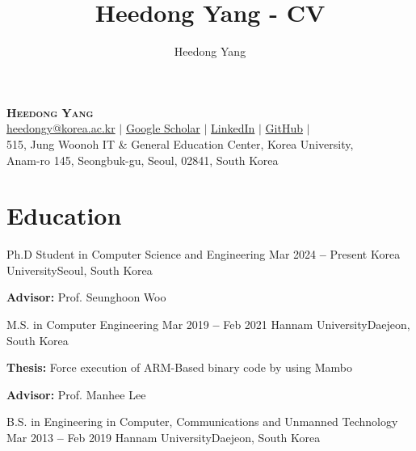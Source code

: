 \documentclass[letterpaper,11pt]{article}
\begin{document}
\title{Heedong Yang - CV}
\author{Heedong Yang}


\begin{center}
    \textbf{\Huge \scshape Heedong Yang} \\ \vspace{7pt}
    \small
    \faEnvelope \hspace{.5pt} \href{mailto:heedongy@korea.ac.kr}{heedongy@korea.ac.kr}
    $|$
    \faGraduationCap \hspace{.5pt} \href{https://scholar.google.co.kr/citations?user=Gqegeu0AAAAJ}{Google Scholar}
    $|$
\faLinkedin \hspace{.5pt} \href{https://www.linkedin.com/in/heedongy}{LinkedIn}
    $|$
    \faGithub \hspace{.5pt} \href{https://github.com/heedongy}{GitHub}
    $|$ \\
\faMapMarker \hspace{.5pt} 515, Jung Woonoh IT \& General Education Center, Korea University, \\
    \hspace{15pt} Anam-ro 145, Seongbuk-gu, Seoul, 02841, South Korea
\end{center}




\section{Education}
  \vspace{3pt}
  \resumeSubHeadingListStart
  \resumeEducationHeading
     {Ph.D Student in Computer Science and Engineering}
     {Mar 2024 \textbf{--} Present}
     {Korea University}{Seoul, South Korea}
        \resumeSubHeadingItemListStart
        \small{\item{\textbf{Advisor:} Prof. Seunghoon Woo}}
        \resumeSubHeadingItemListEnd
   \resumeEducationHeading
     {M.S. in Computer Engineering}   %
     {Mar 2019 \textbf{--} Feb 2021}
     {Hannam University}{Daejeon, South Korea}
        \resumeSubHeadingItemListStart
        \small{\item{\textbf{Thesis:} Force execution of ARM-Based binary code by using Mambo}
        \item{\textbf{Advisor:} Prof. Manhee Lee}}
        \resumeSubHeadingItemListEnd
    \resumeEducationHeading
      {B.S. \small{in Engineering in Computer, Communications and Unmanned Technology}}
      {Mar 2013 \textbf{--} Feb 2019}
      {Hannam University}{Daejeon, South Korea}
  \resumeSubHeadingListEnd
\end{document}
